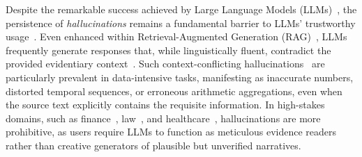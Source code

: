 \documentclass[10pt, a4paper, logo]{googledeepmind} %
\begin{document}
Despite the remarkable success achieved by Large Language Models (LLMs)~\citep{openai2024gpt4technicalreport,touvron2023llamaopenefficientfoundation,yang2024qwen2,deepseekai2025deepseekr1incentivizingreasoningcapability,comanici2025gemini25pushingfrontier},
the persistence of \emph{hallucinations} remains a fundamental barrier to LLMs' trustworthy usage~\citep{kalai2025language,Huang_2025,ji2023survey,maynez2020faithfulnessfactualityabstractivesummarization}. Even enhanced within Retrieval-Augmented Generation (RAG)~\citep{lewis2020retrieval}, LLMs frequently generate responses that, while linguistically fluent, contradict the provided evidentiary context~\citep{xu2025hallucinationinevitableinnatelimitation}. Such context-conflicting hallucinations~\citep{liu2024lost} are particularly prevalent in data-intensive tasks, manifesting as inaccurate numbers, distorted temporal sequences, or erroneous arithmetic aggregations, even when the source text explicitly contains the requisite information. In high-stakes domains, %
such as finance~\citep{kang2023deficiency}, law~\citep{dahl2024large}, and healthcare~\citep{kim2025medical}, 
hallucinations are more prohibitive, as users require LLMs to function as meticulous evidence readers rather than creative generators of plausible but unverified narratives.

\end{document}
